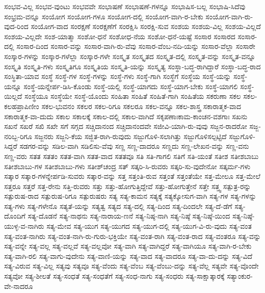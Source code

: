 {ಸಂಭವ-ವಿಲ್ಲ
ಸಂಭವ-ವುಂಟು
ಸಂಭವವೇ
ಸಂಭಾಷಣೆ
ಸಂಭಾಷಣೆ-ಗಳನ್ನೂ
ಸಂಭಾಷಿಸ-ಬಲ್ಲ
ಸಂಭಾಷಿ-ಸಿದೆವು
ಸಂಭ್ರಮ-ವನ್ನೂ
ಸಂಯೋಗ
ಸಂಯೋಗ-ಗಳೂ
ಸಂಯೋಗ-ದಲ್ಲಿ
ಸಂಯೋಗ-ವಾಗಿ-ರ-ಬೇಕು
ಸಂಯೋಗ-ವಾಗಿ-ರು-ವುದ-ರಿಂದ
ಸಂಯೋಗ-ವಾದ
ಸಂರಕ್ಷಣೆ
ಸಂರಕ್ಷಣೆಗೆ
ಸಂರಕ್ಷಿಸಿ
ಸಂರಕ್ಷಿ-ಸುವ
ಸಂಶಯ
ಸಂಶಯ-ವಿಲ್ಲ
ಸಂಶಯ-ವಿಲ್ಲದೆ
ಸಂಶಯ-ವಿಲ್ಲದೇ
ಸಂಶ-ಯಾತ್ಮಾ
ಸಂಶೋ-ಧನೆ
ಸಂಶೋಧ-ನೆಯ
ಸಂಶೋ-ಧನೆ-ಯಷ್ಟೆ
ಸಂಸಾರ
ಸಂಸಾರದ
ಸಂಸಾರ-ದಲ್ಲಿ
ಸಂಸಾರ-ದಿಂದ
ಸಂಸಾರ-ವನ್ನು
ಸಂಸಾರ-ವಾಗಿ-ರು-ವೆವು
ಸಂಸಾರ-ವೆಂಬ-ನದಿ-ಯನ್ನು
ಸಂಸಾರ-ವೆಲ್ಲಾ
ಸಂಸಾರೇ
ಸಂಸ್ಕಾರ-ಗಳನ್ನು
ಸಂಸ್ಕಾರ-ಗಳೆಲ್ಲಾ
ಸಂಸ್ಕಾರ-ಗಳೇ
ಸಂಸ್ಕೃತ
ಸಂಸ್ಕೃತದ
ಸಂಸ್ಕೃತ-ದಲ್ಲಿ
ಸಂಸ್ಕೃತ-ವನ್ನು
ಸಂಸ್ಕೃತ-ವನ್ನೂ
ಸಂಸ್ಕೃತಿ
ಸಂಸ್ಕೃತಿ-ಗಳು
ಸಂಸ್ಕೃತಿಗೂ
ಸಂಸ್ಕೃತಿಯ
ಸಂಸ್ಕೃತಿ-ಯನ್ನು
ಸಂಸ್ಕೃತ್ಯ
ಸಂಸ್ಥಾ-ಬದ್ಧ-ರಾಗಿದ್ದಾರೆ
ಸಂಸ್ಥಾ-ಬದ್ಧ-ರಾದ
ಸಂಸ್ಥಿತಾ-ಯಾವ
ಸಂಸ್ಥೆ
ಸಂಸ್ಥೆ-ಗಳ
ಸಂಸ್ಥೆ-ಗಳನ್ನು
ಸಂಸ್ಥೆ-ಗಳು
ಸಂಸ್ಥೆ-ಗಾಗಿ
ಸಂಸ್ಥೆಗೆ
ಸಂಸ್ಥೆಯ
ಸಂಸ್ಥೆ-ಯನ್ನು
ಸಂಸ್ಥೆ-ಯನ್ನೂ
ಸಂಸ್ಥೆ-ಯನ್ನೇರ್ಪ-ಡಿಸಿ-ಕೊಂಡು
ಸಂಸ್ಥೆ-ಯಲ್ಲಿ
ಸಂಸ್ಥೆ-ಯಾಗದು
ಸಂಸ್ಥೆ-ಯಾಗ-ಬೇಕು
ಸಂಸ್ಥೆ-ಯಾಗಲಿ
ಸಂಸ್ಥೆ-ಯಿಲ್ಲದೆ
ಸಂಸ್ಥೆಯೂ
ಸಂಸ್ಥೆಯೇ
ಸಂಸ್ಥೆ-ಯೊಂದು
ಸಂಹಿತಾ
ಸಂಹಿತೆ
ಸಂಹಿತೆ-ಗಾಗಿ
ಸಂಹಿತೆಯ
ಸಕರುಣಾ
ಸಕಲ
ಸಕಲ-ಕಲಹಪ್ರಾಪಿಣೀಂ
ಸಕಲ-ಭುವನಂ
ಸಕಲರ
ಸಕಲ-ರಿಗೂ
ಸಕಲರೂ
ಸಕಲ-ವನ್ನೂ
ಸಕಲ-ಶಾಸ್ತ್ರ
ಸಕಾರಾತ್ಮಕ-ವಾದ
ಸಕಾರಾತ್ಮಕ-ವಾ-ದುದು
ಸಕಾಲ
ಸಕಾಲಕ್ಕೆ
ಸಕಾಲ-ದಲ್ಲಿ
ಸಕಾಲ-ವಾಗಿದೆ
ಸಕೃಪಣಾಃಕಾಮ-ಕಾಂಚನ-ವಶಗಾಃ
ಸಖನು
ಸಖನೆ
ಸಖರೆ
ಸಖಿ
ಸಖೇ
ಸಗೆ
ಸಗ್ಗದ
ಸಚ್ಚಿದಾನಂದ
ಸಚ್ಚಿದಾನಂದವೇ
ಸಜೀವಿ-ಯಾಗಿ-ರು-ವುವು
ಸಜ್ಜನ-ರಾದರೋ
ಸಜ್ಜ-ನರಿಬ್ಬ-ರಿಗೂ
ಸಜ್ಜನರು
ಸಜ್ಜನಿ-ಕೆಯ
ಸಜ್ಜಿತ-ರಾಗಿ-ರುವುದು
ಸಜ್ಜುಗೊಳಿ-ಸಲಾಗಿತ್ತು
ಸಜ್ಜುಗೊಳಿಸಲ್ಪಟ್ಟಿದೆ
ಸಜ್ಜುಗೊಳಿ-ಸಿದ್ದರೆ
ಸಡಗರ-ವನ್ನು
ಸಡಿಲ-ವಾಗಿ
ಸಡಿಲಿಸು-ವೆವು
ಸಣ್ಣ
ಸಣ್ಣ-ದಾದರೂ
ಸಣ್ಣದು
ಸಣ್ಣ-ಲೇಖನ-ವನ್ನು
ಸಣ್ಣ-ವನು
ಸಣ್ಣ-ವರು
ಸತತ
ಸತತಂ
ಸತತ-ವಾಗಿ
ಸತತ-ವಾದ
ಸತತವೂ
ಸತಿ
ಸತಿ-ಗಾಗಲಿ
ಸತಿಗೆ
ಸತಿ-ಯಂತೆ
ಸತೀಶ
ಸತೀಶಬಾಬು
ಸತೀಶಬಾಬು-ಗಳ
ಸತೀಶಬಾಬು-ಗಳು
ಸತೀಶ್‌ಚಂದ್ರ
ಸತ್
ಸತ್ಕರಿ-ಸಿ-ರುವರು
ಸತ್ಕರಿ-ಸು-ವುದೇನೋ
ಸತ್ಕರ್ಮ-ಗಳು
ಸತ್ಕಾರ
ಸತ್ಕಾರ-ಗಳನ್ನೇರ್ಪಡಿ-ಸುವರು
ಸತ್ಕಾರ-ವನ್ನು
ಸತ್ತ
ಸತ್ತಂತಿ-ರುವ
ಸತ್ತಂತೆ
ಸತ್ತಂತೆಯೇ
ಸತ್ತ-ಮೇಲೂ
ಸತ್ತ-ಮೇಲೆ
ಸತ್ತರೂ
ಸತ್ತರೆ
ಸತ್ತ-ರೇನು
ಸತ್ತಿ-ರುವರು
ಸತ್ತು
ಸತ್ತು-ಹೋಗುತ್ತಿದ್ದೇವೆ
ಸತ್ತು-ಹೋಗುತ್ತೇನೆ
ಸತ್ತೇ
ಸತ್ತ್ವ
ಸತ್ಪುತ್ರ-ರನ್ನು
ಸತ್ಪುರುಷ-ರಾದ
ಸತ್ಪುರುಷ-ರಿಗೂ
ಸತ್ಪುರುಷರು
ಸತ್ಯ
ಸತ್ಯ-ಕಾಮನ
ಸತ್ಯಕ್ಕೆ
ಸತ್ಯಕ್ಕೋಸುಗ-ವಾಗಿ
ಸತ್ಯ-ಗಳ
ಸತ್ಯ-ಗಳನ್ನು
ಸತ್ಯ-ಗಳು
ಸತ್ಯ-ಗಳೇನೊ
ಸತ್ಯತೆ-ಯನ್ನು
ಸತ್ಯತ್ವ
ಸತ್ಯದ
ಸತ್ಯ-ದಲ್ಲಿ
ಸತ್ಯ-ದಿಂದ
ಸತ್ಯ-ದಿಂದಲೇ
ಸತ್ಯ-ದೆ-ಡೆಗೆ
ಸತ್ಯ-ದೊಂದಿಗೆ
ಸತ್ಯ-ದೊಡನೆ
ಸತ್ಯ-ನಾಥನು
ಸತ್ಯ-ನಾರಾಯ-ಣನೆ
ಸತ್ಯ-ನಿಷ್ಠ-ನಾಗಿ
ಸತ್ಯ-ನಿಷ್ಠೆ
ಸತ್ಯ-ನಿಷ್ಠೆ-ಯಿಂದ
ಸತ್ಯ-ನಿಷ್ಠೆ-ಯುಳ್ಳ-ವ-ನಾಗಿರು
ಸತ್ಯ-ಮೇವ
ಸತ್ಯ-ಯುಗ
ಸತ್ಯ-ಯುಗದ
ಸತ್ಯ-ಯುಗ-ದಲ್ಲಿ
ಸತ್ಯ-ಯುಗ-ವಿ-ರು-ವುದು
ಸತ್ಯ-ವಂತ
ಸತ್ಯ-ವಂತ-ನಾಗಿರು
ಸತ್ಯ-ವಂತ-ನಾಗಿ-ರು-ಗುರು-ಭಕ್ತಿಯೇ
ಸತ್ಯ-ವಂತ-ರಾಗಿ
ಸತ್ಯ-ವಂತ-ರಾದ
ಸತ್ಯ-ವಂತರೂ
ಸತ್ಯ-ವನ್ನು
ಸತ್ಯ-ವನ್ನೇ
ಸತ್ಯ-ವಲ್ಲ
ಸತ್ಯ-ವಲ್ಲವೆ
ಸತ್ಯ-ವಲ್ಲವೋ
ಸತ್ಯ-ವಾಗಿ
ಸತ್ಯ-ವಾಗಿದ್ದರೆ
ಸತ್ಯ-ವಾಗಿಯೂ
ಸತ್ಯ-ವಾಗಿ-ರ-ಬೇಕು
ಸತ್ಯ-ವಾಗಿ-ರಲಿ
ಸತ್ಯ-ವಾಗು-ವುದೇನು
ಸತ್ಯ-ವಾಣಿ-ಯನ್ನು
ಸತ್ಯ-ವಾದ
ಸತ್ಯ-ವಾದರೂ
ಸತ್ಯ-ವಾ-ದು-ದನ್ನು
ಸತ್ಯ-ವಿದೆ
ಸತ್ಯ-ವಿರುವ
ಸತ್ಯ-ವಿಲ್ಲ
ಸತ್ಯವು
ಸತ್ಯವೂ
ಸತ್ಯ-ವೆಂದು
ಸತ್ಯ-ವೆಂಬ
ಸತ್ಯ-ವೆಂಬು-ದನ್ನು
ಸತ್ಯ-ವೆಲ್ಲ
ಸತ್ಯವೇ
ಸತ್ಯ-ವೊಂದೇ
ಸತ್ಯವೋ
ಸತ್ಯ-ಶೀಲತೆ
ಸತ್ಯ-ಸಂಧತೆ
ಸತ್ಯ-ಸಂಧತೆಗೆ
ಸತ್ಯ-ಸಂಧ-ನಾಗು
ಸತ್ಯ-ಸಂಧರು
ಸತ್ಯ-ಸಾಕ್ಷಾತ್ಕಾರಕ್ಕೆ
ಸತ್ಯಾಂಕುರ-ವೇ-ನಾದರೂ
}
